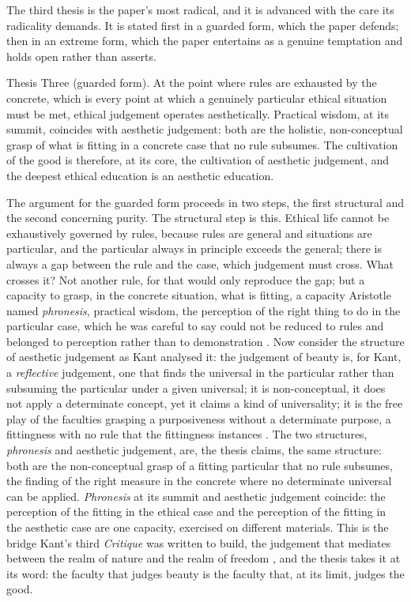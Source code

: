 The third thesis is the paper's most radical, and it is advanced with the care its radicality demands. It is stated first in a guarded form, which the paper defends; then in an extreme form, which the paper entertains as a genuine temptation and holds open rather than asserts.

\begin{thesis}{Thesis Three (guarded form).}
At the point where rules are exhausted by the concrete, which is every point at which a genuinely particular ethical situation must be met, ethical judgement operates aesthetically. Practical wisdom, at its summit, coincides with aesthetic judgement: both are the holistic, non-conceptual grasp of what is fitting in a concrete case that no rule subsumes. The cultivation of the good is therefore, at its core, the cultivation of aesthetic judgement, and the deepest ethical education is an aesthetic education.
\end{thesis}

\noindent
The argument for the guarded form proceeds in two steps, the first structural and the second concerning purity. The structural step is this. Ethical life cannot be exhaustively governed by rules, because rules are general and situations are particular, and the particular always in principle exceeds the general; there is always a gap between the rule and the case, which judgement must cross. What crosses it? Not another rule, for that would only reproduce the gap; but a capacity to grasp, in the concrete situation, what is fitting, a capacity Aristotle named \emph{phronesis}, practical wisdom, the perception of the right thing to do in the particular case, which he was careful to say could not be reduced to rules and belonged to perception rather than to demonstration \parencite{aristotle2000}. Now consider the structure of aesthetic judgement as Kant analysed it: the judgement of beauty is, for Kant, a \emph{reflective} judgement, one that finds the universal in the particular rather than subsuming the particular under a given universal; it is non-conceptual, it does not apply a determinate concept, yet it claims a kind of universality; it is the free play of the faculties grasping a purposiveness without a determinate purpose, a fittingness with no rule that the fittingness instances \parencite{kant1987}. The two structures, \emph{phronesis} and aesthetic judgement, are, the thesis claims, the same structure: both are the non-conceptual grasp of a fitting particular that no rule subsumes, the finding of the right measure in the concrete where no determinate universal can be applied. \emph{Phronesis} at its summit and aesthetic judgement coincide: the perception of the fitting in the ethical case and the perception of the fitting in the aesthetic case are one capacity, exercised on different materials. This is the bridge Kant's third \emph{Critique} was written to build, the judgement that mediates between the realm of nature and the realm of freedom \parencite{kant1987}, and the thesis takes it at its word: the faculty that judges beauty is the faculty that, at its limit, judges the good.

